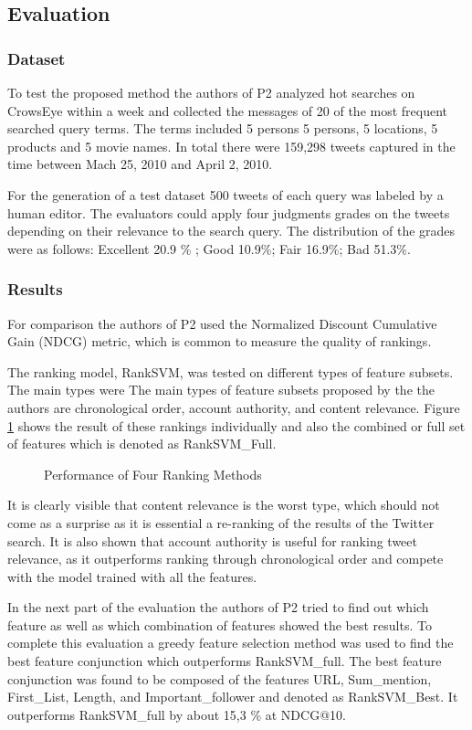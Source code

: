 \documentclass{proseminar}
\begin{document}
\subsection*{Evaluation}
\subsubsection*{Dataset}
To test the proposed method the authors of P2 analyzed hot searches on CrowsEye within a week and collected the messages of 20 of the most frequent searched query terms. The terms included 5 persons 5 persons, 5 locations, 5 products and 5 movie names. 
In total there were 159,298 tweets captured in the time between Mach 25, 2010 and April 2, 2010.

For the generation of a test dataset 500 tweets of each query was labeled by a human editor. The evaluators could apply four judgments grades on the tweets depending on their relevance to the search query. 
The distribution of the grades were as follows: Excellent 20.9 \% ; Good 10.9\%; Fair 16.9\%; Bad 51.3\%.


\subsubsection*{Results}
For comparison the authors of P2 used the Normalized Discount Cumulative Gain (NDCG) metric, which is common to measure the quality of rankings.

The ranking model, RankSVM, was tested on different types of feature subsets. The main types were 
The main types of feature subsets proposed by the the authors are chronological order, account authority, and content relevance. Figure \ref{fig:ranking} shows the result of these rankings individually and also the combined or full set of features which is denoted as RankSVM\_Full.

\begin{figure}[h]
\centering
{}
\caption{Performance of Four Ranking Methods}
\label{fig:ranking}
\end{figure}

It is clearly visible that content relevance is the worst type, which should not come as a surprise as it is essential a re-ranking of the results of the Twitter search. It is also shown that account authority is useful for ranking tweet relevance, as it outperforms ranking through chronological order and compete with the model trained with all the features.

In the next part of the evaluation the authors of P2 tried to find out which feature as well as which combination of features showed the best results.
To complete this evaluation a greedy feature selection method was used to find the best feature conjunction which outperforms RankSVM\_full. The best feature conjunction was found to be composed of the features URL, Sum\_mention, First\_List, Length, and Important\_follower and denoted as RankSVM\_Best. It outperforms RankSVM\_full by about 15,3 \% at NDCG@10.
\end{document}
